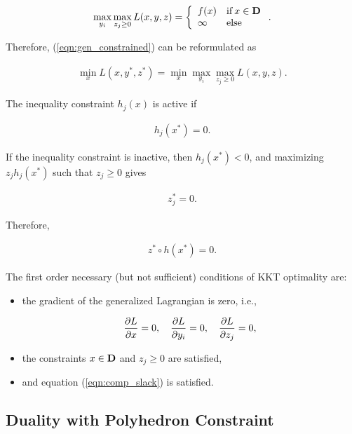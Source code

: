 \documentclass{article}
\begin{document}
\begin{align}
    \max_{y_i}\max_{z_j\geq 0} L(x,y,z) = \left\{
    \begin{array}{lllllllllllllllllll}
        f(x) & \text{if}\:x\in\textbf{D}\\
        \infty & \text{else}
    \end{array}   \right..
\end{align}

Therefore, (\ref{eqn:gen_constrained}) can be reformulated as

\begin{align*}
    \min_x L(x,y^*,z^*) = \min_x\max_{y_i}\max_{z_j\geq 0} L(x,y,z).
\end{align*}

The inequality constraint $h_j(x)$ is active if

\begin{align*} 
    h_j(x^*)=0.
\end{align*}

If the inequality constraint is inactive, then $h_j(x^*)<0$, 
and maximizing $z_j h_j(x^*)$ such that $z_j\geq0$ gives

\begin{align*} 
    z_j^*=0.
\end{align*}

Therefore,

\begin{align} 
    z^*\circ h(x^*)=0.\label{eqn:comp_slack}
\end{align}


The first order necessary (but not sufficient) conditions of KKT optimality are:

\begin{itemize}
    \item the gradient of the generalized Lagrangian is zero, i.e.,

        \begin{align*}
            \frac{\partial L}{\partial x}=0,\quad
            \frac{\partial L}{\partial y_i}=0,\quad
            \frac{\partial L}{\partial z_j}=0,
        \end{align*}  

    \item the constraints $x\in\textbf{D}$ and $z_j\geq0$ are satisfied,

    \item and equation (\ref{eqn:comp_slack}) is satisfied.
\end{itemize}

\clearpage
\subsection{Duality with Polyhedron Constraint}
\end{document}
